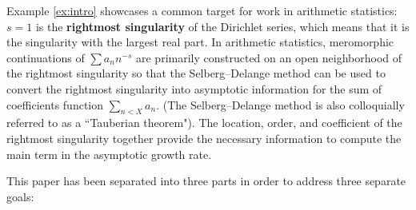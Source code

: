 \documentclass[12pt]{amsart}
\theoremstyle{plain}
\begin{document}
Example \ref{ex:intro} showcases a common target for work in arithmetic statistics: $s=1$ is the \textbf{rightmost singularity} of the Dirichlet series, which means that it is the singularity with the largest real part. In arithmetic statistics, meromorphic continuations of $\sum a_n n^{-s}$ are primarily constructed on an open neighborhood of the rightmost singularity so that the Selberg--Delange method can be used to convert the rightmost singularity into asymptotic information  for the sum of coefficients function $\sum_{n < X} a_n$. (The Selberg--Delange method is also colloquially referred to as a ``Tauberian theorem"). The location, order, and coefficient of the rightmost singularity together provide the necessary information to compute the main term in the asymptotic growth rate.

This paper has been separated into three parts in order to address three separate goals:
\end{document}
